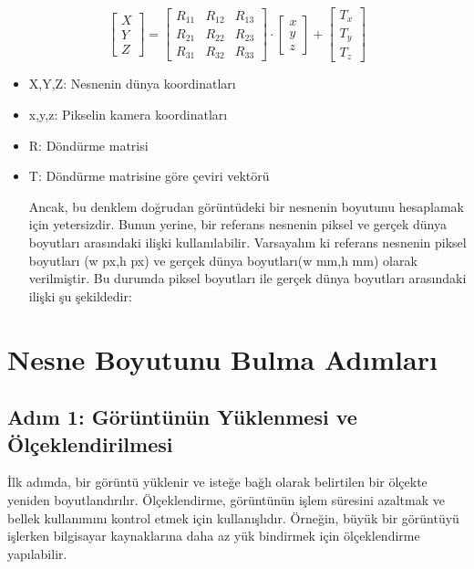 \documentclass[11pt,a4paper]{report}
\begin{document}
	
	\begin{equation}
		\begin{bmatrix}
			X \\
			Y \\
			Z
		\end{bmatrix} = \begin{bmatrix}
			R_{11} & R_{12} & R_{13} \\
			R_{21} & R_{22} & R_{23} \\
			R_{31} & R_{32} & R_{33}
		\end{bmatrix} \cdot \begin{bmatrix}
			x \\
			y \\
			z
		\end{bmatrix} + \begin{bmatrix}
			T_{x} \\
			T_{y} \\
			T_{z}
		\end{bmatrix}
	\end{equation}
	\begin{itemize}

	\item X,Y,Z: Nesnenin dünya koordinatları
	\item x,y,z: Pikselin kamera koordinatları
	\item R: Döndürme matrisi
	\item T: Döndürme matrisine göre çeviri vektörü
	
	Ancak, bu denklem doğrudan görüntüdeki bir nesnenin boyutunu hesaplamak için yetersizdir. Bunun yerine, bir referans nesnenin piksel ve gerçek dünya boyutları arasındaki ilişki kullanılabilir.
	Varsayalım ki referans nesnenin piksel boyutları 
	(w px,h px) ve gerçek dünya boyutları(w mm,h mm) olarak verilmiştir. Bu durumda piksel boyutları ile gerçek dünya boyutları arasındaki ilişki şu şekildedir:
	
	\end{itemize}
	
	\section{Nesne Boyutunu Bulma Adımları}
	\subsection{Adım 1: Görüntünün Yüklenmesi ve Ölçeklendirilmesi}
	İlk adımda, bir görüntü yüklenir ve isteğe bağlı olarak belirtilen bir ölçekte yeniden boyutlandırılır. Ölçeklendirme, görüntünün işlem süresini azaltmak ve bellek kullanımını kontrol etmek için kullanışlıdır. Örneğin, büyük bir görüntüyü işlerken bilgisayar kaynaklarına daha az yük bindirmek için ölçeklendirme yapılabilir.
	
\end{document}
